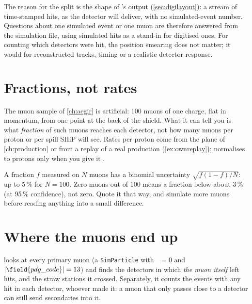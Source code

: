 The reason for the split is the shape of 's output
(\cref{sec:digilayout}): a stream of time-stamped hits, as the detector will
deliver, with no simulated-event number. Questions about one simulated event
or one muon are therefore answered from the simulation file, using simulated
hits as a stand-in for digitised ones. For counting which detectors were hit,
the position smearing does not matter; it would for reconstructed tracks,
timing or a realistic detector response.

\section{Fractions, not rates}

The muon sample of \cref{ch:aegir} is artificial: 100 muons of one charge,
flat in momentum, from one point at the back of the shield. What it can tell
you is what \emph{fraction} of such muons reaches each detector, not how many
muons per proton or per spill SHiP will see. Rates per proton come from the
plane of \cref{ch:production} or from a replay of a real production
(\cref{ex:ownreplay});  normalises to protons only
when you give it .

\begin{pitfall}
A fraction $f$ measured on $N$ muons has a binomial uncertainty
$\sqrt{f(1-f)/N}$: up to 5\,\% for $N=100$. Zero muons out of 100 means a
fraction below about 3\,\% (at 95\,\% confidence), not zero. Quote it that
way, and simulate more muons before reading anything into a small difference.
\end{pitfall}

\section{Where the muons end up}

 looks at every primary muon (a
\texttt{SimParticle} with ~$=0$ and $|\field{pdg\_code}|=13$)
and finds the detectors in which \emph{the muon itself} left hits, and the
straw stations it crossed. Separately, it counts the events with any hit in
each detector, whoever made it: a muon that only passes close to a detector
can still send secondaries into it.

